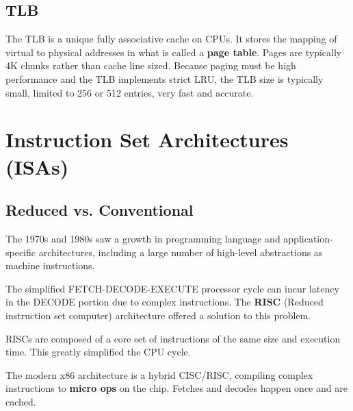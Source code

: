 \documentclass[twoside]{article}
\begin{document}
\subsection{TLB}

The TLB is a unique fully associative cache on CPUs. It stores the mapping of
virtual to physical addresses in what is called a \textbf{page table}. Pages are
typically 4K chunks rather than cache line sized. Because paging must be high
performance and the TLB implements strict LRU, the TLB size is typically small,
limited to 256 or 512 entries, very fast and accurate.

\section{Instruction Set Architectures (ISAs)}

\subsection{Reduced vs. Conventional}

The 1970s and 1980s saw a growth in programming language and
application-specific architectures, including a large number of high-level
abstractions as machine instructions.

The simplified FETCH-DECODE-EXECUTE processor cycle can incur latency in the
DECODE portion due to complex instructions. The \textbf{RISC} (Reduced instruction
set computer) architecture offered a solution to this problem.

RISCs are composed of a core set of instructions of the same size and execution
time. This greatly simplified the CPU cycle.

The modern x86 architecture is a hybrid CISC/RISC, compiling complex
instructions to \textbf{micro ops} on the chip. Fetches and decodes happen once
and are cached.
\end{document}
